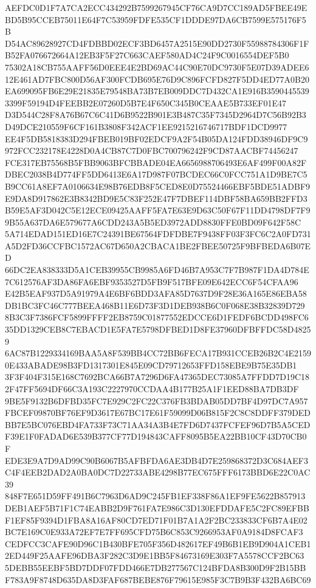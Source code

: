 \documentclass[UTF8,fontset=fandol,zihao=-4,a4paper]{ctexart}
\begin{document}
{{AEFDC0D1F7A7CA2ECC434292B7599267945CF76CA9D7CC189AD5FBEE49EBD5B95CCEB75011E64F7C53959FDFE535CF1DDDE97DA6CB7599E575176F5B
D54AC89628927CD4FDBBD02ECF3BD6457A2515E90DD2730F55988784306F1FB52FA076672664A12EB3F5F27C663CAEF580AD4C24F9C0016554DEF5B0
75302A18CB755AAFF56D0EEE4E2BD69AC44C90E70DC9730F5E07D39ADEE612E461AD7FBC800D56AF300FCDB695E76D9C896FCFD827F5DD4ED77A0B20
EA699095FB6E29E21835E79548BA73B7EB009DDC7D432CA1E916B35904455393399F59194D4FEEBB2E07260D5B7E4F650C345B0CEAAE5B733EF01E47
D3D544C28F8A76B67C6C41D6B9522B901E3B487C35F7345D2964D7C56B92B3D49DCE210559F6CF161B3808F342ACF1EE9215216746717BDF1DCD9977
EE4F5DB5818383D294FBEB019BF02EDCF9A2F54B05DA124FDD38946DF9C9972FCC232178E4228D0A4CB87C7D0FBC700796242F9CD87AACBF74456247
FCE317EB75568B5FBB9063BFCBBADE04EA6656988706493E6AF499F00A82FDBEC2038B4D774FF5DD6413E6A17D987F07BCDEC66C0FCC751A1D9BE7C5
B9CC61A8EF7A0106634E98B76EDB8F5CED8E0D75524466EBF5BDE51ADBF9E9DA8D917862E3B8342BD9E5C83F252E47F7DBEF114DBF58BA659BB2FFD3
B59E5AF3D042C5E12ECE09425AAFF5FA7E63E9D63C50F67F11DD4798DF7F99B55A637DA6E579677A6CDD243A5B5ED3972ADD8830FFE0BD09F642F58C
5A714EDAD151ED16E7C24391BE67564FDFDBE7F9438FF03F3FC6C2A0FD731A5D2FD36CCFBC1572AC67D650A2CBACA1BE2FBEE50725F9BFBEDA6B07ED
66DC2EA838333D5A1CEB39955CB9985A6FD46B7A953C7F7B987F1DA4D784E7C612576AF3DA86FA6EBF9353527D5FB9F517BFE09E642ECC6F54CFAA96
E42B5EAF937D5A91979A4E6BF6BDD3AFA85D7637D9F28E36A165E86EBA58DB1BC3FC46C777BEEA468B11E6D73F3D1DEB938B6C0F068E38B32839D729
8B3C3F7386FCF5899FFFF2EB8759C01877552EDCCE6D1FEDF6BCDD498FC635DD1329CEB8C7EBACD1E5FA7E5798DFBED1D8FE37960DFBFFDC58D48259
6AC87B1229334169BAA5A8F539BB4CC72BB6FECA17B931CCEB26B2C4E21590E433ABADE98B3FD1317301E845E09CD79712653FFD158EBE9B75E35DB1
3F3F404F315E168C7692BCA66B7A7296D6FA47365DEC73085A7FFDD7D19C182F47FF5694DF66C3A193C2227970CCDAA4B177B25A1F1EED88BA7DB3DF
9BE5F9132B6DFBD35FC7E929C2FC22C376FB3BDAB05DD7BF4D97DC7A957FBCEF09870BF76EF9D3617E67BC17E61F59099D06B815F2C8C8DDFF379DED
BB7E5BC076EBD4FA733F73C71AA34A3B4E7FD6D7437FCFEF96D7B5A5CEDF39E1F0FADAD6E539B377CF77D194843CAFF8095B5EA22BB10CF43D70CB0F
EDE3E9A7D9AD99C90B6067B5AFBFDA6AE3DB4D7E259868372D3C684AEF3C4F4EEB2DAD2A0BA0DC7D22733ABE4298B77EC675FFF6173BBD6E22C0AC39
848F7E651D59FF491B6C7963D6AD9C245FB1EF338F86A1EF9FE5622B857913DEB1AEF5B71F1C74EABB2D9F761FA7E986C3D130EFDDAFE5C2FC89EFBB
F1EF85F9394D1FBA8A16AF80CD7ED71F01B7A1A2F2BC233833CF6B7A4E02BC7E169C0E933A72EF7E7FF695CFD75B6C853C9266953AF0A9184D8FCAF3
CEDFCC3CAFE90D96C1B430BFE705F356D482617EF49B6B1EB9D904A1CEB12ED449F25AAFE96DBA3F282C3D9E1BB5F84673169E303F7A5578CCF2BC63
5DEBB55EEBF5BD7DDF07FDD466E7DB277567C124BFDA8B300D9F2B15BBF783A9F8748D635DA8D3FAF687BEBE876F79615E985F3C7B9B3F432BA6BC69
}}
\end{document}
